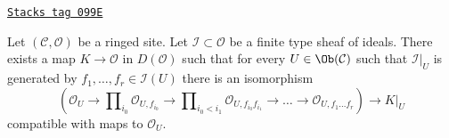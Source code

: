 \begin{lemma}
\label{algebraization-lemma-global-extended-cech-complex}
\href{https://stacks.math.columbia.edu/tag/099E}{\texttt{Stacks tag 099E}}

Let $(\mathcal{C}, \mathcal{O})$ be a ringed site. Let
$\mathcal{I} \subset \mathcal{O}$ be a finite type sheaf of ideals.
There exists a map $K \to \mathcal{O}$ in $D(\mathcal{O})$
such that for every $U \in \Ob(\mathcal{C})$ such that
$\mathcal{I}|_U$ is generated by $f_1, \ldots, f_r \in \mathcal{I}(U)$
there is an isomorphism
$$
(\mathcal{O}_U \to \prod\nolimits_{i_0} \mathcal{O}_{U, f_{i_0}} \to
\prod\nolimits_{i_0 < i_1} \mathcal{O}_{U, f_{i_0}f_{i_1}} \to
\ldots \to \mathcal{O}_{U, f_1\ldots f_r}) \longrightarrow K|_U
$$
compatible with maps to $\mathcal{O}_U$.
\end{lemma}

